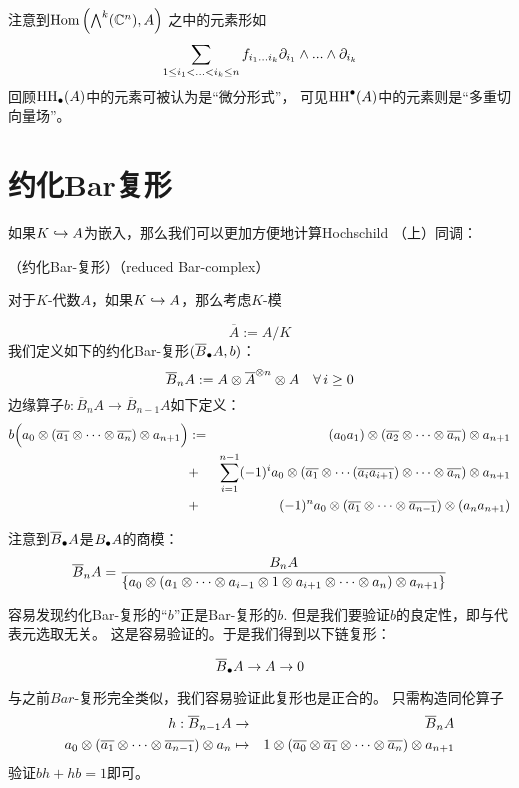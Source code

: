 注意到$\operatorname{Hom}\left(\bigwedge\nolimits^{k}(\mathbb{C}^n),A\right)$
之中的元素形如
$$
\sum_{1\leq i_1<...<i_k\leq n}
f_{i_1...i_k}\partial_{i_1}\wedge...\wedge\partial_{i_k}
$$
回顾$\operatorname{HH}_{\bullet}(A)$中的元素可被认为是“微分形式”，
可见$\operatorname{HH}^{\bullet}(A)$中的元素则是“多重切向量场”。




\section{约化Bar复形}

如果$K\hookrightarrow A$为嵌入，那么我们可以更加方便地计算Hochschild
（上）同调：

\begin{definition}（约化Bar-复形）（reduced Bar-complex）
\label{约化Bar复形-def}

对于$K$-代数$A$，如果$K\hookrightarrow A$，那么考虑$K$-模

$$\overline{A}:=A/K$$
我们定义如下的约化Bar-复形$(\overline{B}_{\bullet} A,b)$：
$$\overline{B}_n A:=A\otimes \overline{A}^{\otimes n}\otimes A
\quad \forall \,i\geq 0$$
边缘算子$b:\overline{B}_n A\to \overline{B}_{n-1} A$如下定义：
\begin{eqnarray*}
b\Big(a_0\otimes(\overline{a_1}\otimes\cdots\otimes \overline{a_n})\otimes a_{n+1}\Big)
&:=&
 (a_0a_1)\otimes(\overline{a_2}\otimes\cdots\otimes\overline{a_n})\otimes a_{n+1}\\
&+ &
 \sum_{i=1}^{n-1}(-1)^ia_0\otimes
    (\overline{a_1}\otimes\cdots
    (\overline{a_ia_{i+1}})\otimes\cdots\otimes \overline{a_n})
    \otimes a_{n+1}\\
&+ &(-1)^n
 a_0\otimes(\overline{a_1}\otimes\cdots\otimes \overline{a_{n-1}})
   \otimes(a_na_{n+1})
\end{eqnarray*}
\end{definition}

注意到$\overline{B}_{\bullet} A$是$B_{\bullet} A$的商模：
$$\overline{B}_nA=
     \frac{B_n A}
     {\{a_0\otimes(a_1\otimes\cdots
     \otimes a_{i-1}\otimes 1\otimes a_{i+1}
     \otimes\cdots\otimes a_n)\otimes a_{n+1}\}
     }
$$

容易发现约化Bar-复形的“$b$”正是Bar-复形的$b$.
但是我们要验证$b$的良定性，即与代表元选取无关。
这是容易验证的。于是我们得到以下链复形：

$$\overline{B}_{\bullet} A\to A\to 0$$

与之前$Bar$-复形完全类似，我们容易验证此复形也是正合的。
只需构造同伦算子
\begin{eqnarray*}
h:\overline{B}_{n-1}A&\to&\overline{B}_{n}A\\
a_0\otimes(\overline{a_1}\otimes\cdots\otimes \overline{a_{n-1}})\otimes a_{n}
&\mapsto&
1\otimes(\overline{a_0}\otimes\overline{a_1}\otimes\cdots\otimes \overline{a_n})\otimes a_{n+1}
\end{eqnarray*}
验证$bh+hb=1$即可。

